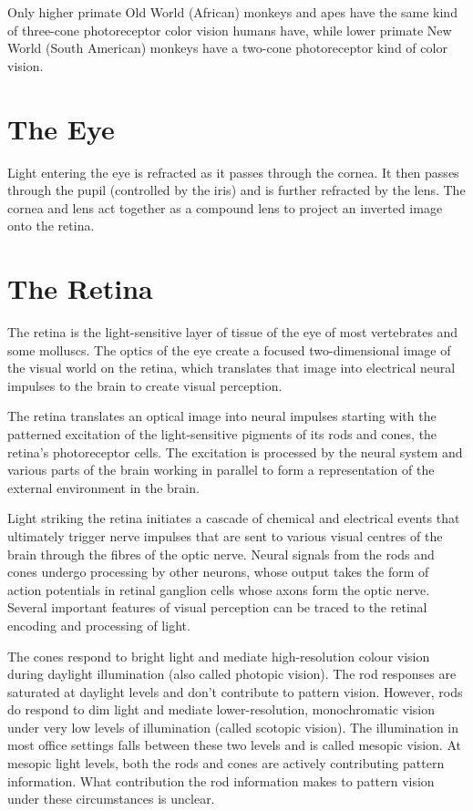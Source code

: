 \documentclass[]{book}
\begin{document}
Only higher primate Old World (African) monkeys and apes have the same kind of three-cone photoreceptor color vision humans have, while lower primate New World (South American) monkeys have a two-cone photoreceptor kind of color vision.

\hypertarget{the-eye}{%
\section{The Eye}\label{the-eye}}

Light entering the eye is refracted as it passes through the cornea. It then passes through the pupil (controlled by the iris) and is further refracted by the lens. The cornea and lens act together as a compound lens to project an inverted image onto the retina.

\hypertarget{the-retina}{%
\section{The Retina}\label{the-retina}}

The retina is the light-sensitive layer of tissue of the eye of most vertebrates and some molluscs. The optics of the eye create a focused two-dimensional image of the visual world on the retina, which translates that image into electrical neural impulses to the brain to create visual perception.

The retina translates an optical image into neural impulses starting with the patterned excitation of the light-sensitive pigments of its rods and cones, the retina's photoreceptor cells. The excitation is processed by the neural system and various parts of the brain working in parallel to form a representation of the external environment in the brain.

Light striking the retina initiates a cascade of chemical and electrical events that ultimately trigger nerve impulses that are sent to various visual centres of the brain through the fibres of the optic nerve. Neural signals from the rods and cones undergo processing by other neurons, whose output takes the form of action potentials in retinal ganglion cells whose axons form the optic nerve. Several important features of visual perception can be traced to the retinal encoding and processing of light.

The cones respond to bright light and mediate high-resolution colour vision during daylight illumination (also called photopic vision). The rod responses are saturated at daylight levels and don't contribute to pattern vision. However, rods do respond to dim light and mediate lower-resolution, monochromatic vision under very low levels of illumination (called scotopic vision). The illumination in most office settings falls between these two levels and is called mesopic vision. At mesopic light levels, both the rods and cones are actively contributing pattern information. What contribution the rod information makes to pattern vision under these circumstances is unclear.
\end{document}
